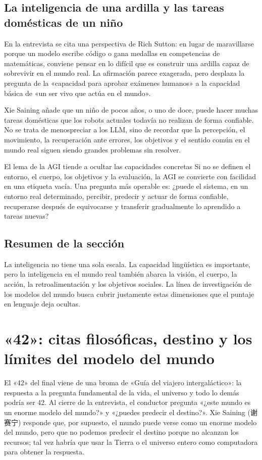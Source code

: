 \documentclass[a4paper]{article}
\begin{document}
\subsection{La inteligencia de una ardilla y las tareas domésticas de un niño}

En la entrevista se cita una perspectiva de Rich Sutton: en lugar de maravillarse porque un modelo escribe código o gana medallas en competencias de matemáticas, conviene pensar en lo difícil que es construir una ardilla capaz de sobrevivir en el mundo real. La afirmación parece exagerada, pero desplaza la pregunta de la «capacidad para aprobar exámenes humanos» a la capacidad básica de «un ser vivo que actúa en el mundo».

Xie Saining añade que un niño de pocos años, o uno de doce, puede hacer muchas tareas domésticas que los robots actuales todavía no realizan de forma confiable. No se trata de menospreciar a los LLM, sino de recordar que la percepción, el movimiento, la recuperación ante errores, los objetivos y el sentido común en el mundo real siguen siendo grandes problemas sin resolver.

\begin{warningbox}{El lema de la AGI tiende a ocultar las capacidades concretas}
Si no se definen el entorno, el cuerpo, los objetivos y la evaluación, la AGI se convierte con facilidad en una etiqueta vacía. Una pregunta más operable es: ¿puede el sistema, en un entorno real determinado, percibir, predecir y actuar de forma confiable, recuperarse después de equivocarse y transferir gradualmente lo aprendido a tareas nuevas?
\end{warningbox}

\subsection{Resumen de la sección}

La inteligencia no tiene una sola escala. La capacidad lingüística es importante, pero la inteligencia en el mundo real también abarca la visión, el cuerpo, la acción, la retroalimentación y los objetivos sociales. La línea de investigación de los modelos del mundo busca cubrir justamente estas dimensiones que el puntaje en lenguaje deja ocultas.
\section{«42»: citas filosóficas, destino y los límites del modelo del mundo}

El «42» del final viene de una broma de «Guía del viajero intergaláctico»: la respuesta a la pregunta fundamental de la vida, el universo y todo lo demás podría ser 42. Al cierre de la entrevista, el conductor pregunta «¿este mundo es un enorme modelo del mundo?» y «¿puedes predecir el destino?». Xie Saining (谢赛宁) responde que, por supuesto, el mundo puede verse como un enorme modelo del mundo, pero que no podemos predecir el destino porque no alcanzan los recursos; tal vez habría que usar la Tierra o el universo entero como computadora para obtener la respuesta.
\end{document}
